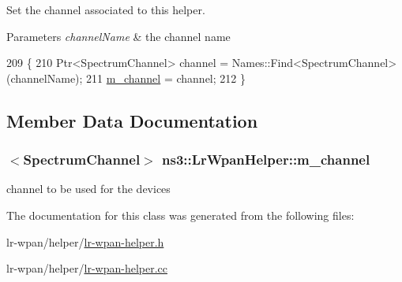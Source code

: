 Set the channel associated to this helper. 


\begin{DoxyParams}{Parameters}
{\em channel\+Name} & the channel name \\
\hline
\end{DoxyParams}

\begin{DoxyCode}
209 \{
210   Ptr<SpectrumChannel> channel = Names::Find<SpectrumChannel> (channelName);
211   \hyperlink{classns3_1_1LrWpanHelper_a13775159dee475491181d3fb0a8069ec}{m\_channel} = channel;
212 \}
\end{DoxyCode}


\subsection{Member Data Documentation}
\subsubsection[{\texorpdfstring{m\+\_\+channel}{m_channel}}]{$<${\bf Spectrum\+Channel}$>$ ns3\+::\+Lr\+Wpan\+Helper\+::m\+\_\+channel\hspace{0.3cm}{\ttfamily [private]}}\hypertarget{classns3_1_1LrWpanHelper_a13775159dee475491181d3fb0a8069ec}{}\label{classns3_1_1LrWpanHelper_a13775159dee475491181d3fb0a8069ec}


channel to be used for the devices 



The documentation for this class was generated from the following files\+:\begin{DoxyCompactItemize}
\item 
lr-\/wpan/helper/\hyperlink{lr-wpan-helper_8h}{lr-\/wpan-\/helper.\+h}\item 
lr-\/wpan/helper/\hyperlink{lr-wpan-helper_8cc}{lr-\/wpan-\/helper.\+cc}\end{DoxyCompactItemize}
